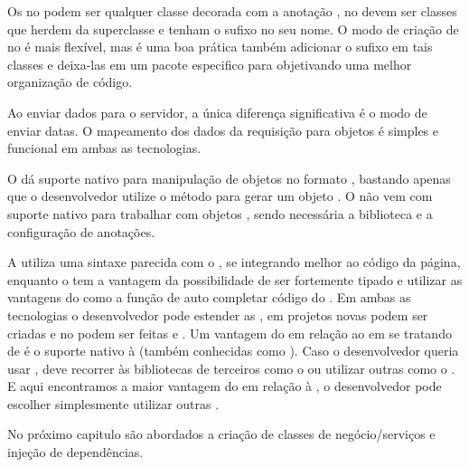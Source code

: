 Os  no  podem ser qualquer classe decorada com a anotação , no  devem ser classes que herdem da superclasse  e tenham o sufixo  no seu nome. O modo de criação de  no  é mais flexível, mas é uma boa prática também adicionar o sufixo  em tais classes e deixa-las em um pacote especifico para  objetivando uma melhor organização de código.

Ao enviar dados para o servidor, a única diferença significativa é o modo de enviar datas. O mapeamento dos dados da requisição  para objetos é simples e funcional em ambas as tecnologias.

O  dá suporte nativo para manipulação de objetos no formato , bastando apenas que o desenvolvedor utilize o método  para gerar um objeto . O  não vem com suporte nativo para trabalhar com objetos , sendo necessária a biblioteca  e a configuração de anotações.

A   utiliza uma sintaxe parecida com o , se integrando melhor ao código da página, enquanto o  tem a vantagem da possibilidade de ser fortemente tipado e utilizar as vantagens do  como a função de auto completar código do . Em ambas as tecnologias o desenvolvedor pode estender as , em projetos  novas  podem ser criadas e no  podem ser feitas  e . Um vantagem do  em relação ao  em se tratando de  é o suporte nativo à  (também conhecidas como ). Caso o desenvolvedor  queria usar , deve recorrer às bibliotecas de terceiros como o  ou utilizar outras  como o . E aqui encontramos a maior vantagem do  em relação à , o desenvolvedor pode escolher simplesmente utilizar outras .

No próximo capitulo são abordados a criação de classes de negócio/serviços e injeção de dependências.